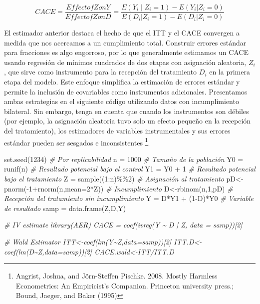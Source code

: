 \documentclass[
]{article}
\newenvironment{Shaded}{\begin{snugshade}}{\end{snugshade}}
\newcommand{\AttributeTok}[1]{\textcolor[rgb]{0.77,0.63,0.00}{#1}}
\newcommand{\CommentTok}[1]{\textcolor[rgb]{0.56,0.35,0.01}{\textit{#1}}}
\newcommand{\DecValTok}[1]{\textcolor[rgb]{0.00,0.00,0.81}{#1}}
\newcommand{\FunctionTok}[1]{\textcolor[rgb]{0.00,0.00,0.00}{#1}}
\newcommand{\NormalTok}[1]{#1}
\newcommand{\OtherTok}[1]{\textcolor[rgb]{0.56,0.35,0.01}{#1}}
\newcommand{\SpecialCharTok}[1]{\textcolor[rgb]{0.00,0.00,0.00}{#1}}
\begin{document}
\[CACE= \frac{Effect of Z on Y}{Effect of Z on D}=\frac{E(Y_i∣Z_i=1)-E(Y_i|Z_i=0)}{E(D_i|Z_i=1)-E(D_i|Z_i=0)}\]

El estimador anterior destaca el hecho de que el ITT y el CACE convergen
a medida que nos acercamos a un cumplimiento total. Construir errores
estándar para fracciones es algo engorroso, por lo que generalmente
estimamos un CACE usando regresión de mínimos cuadrados de dos etapas
con asignación aleatoria, \(Z_i\), que sirve como instrumento para la
recepción del tratamiento \(D_i\) en la primera etapa del modelo. Este
enfoque simplifica la estimación de errores estándar y permite la
inclusión de covariables como instrumentos adicionales. Presentamos
ambas estrategias en el siguiente código utilizando datos con
incumplimiento bilateral. Sin embargo, tenga en cuenta que cuando los
instrumentos son débiles (por ejemplo, la asignación aleatoria tuvo solo
un efecto pequeño en la recepción del tratamiento), los estimadores de
variables instrumentales y sus errores estándar pueden ser sesgados e
inconsistentes \footnote{Angrist, Joshua, and Jörn-Steffen Pischke.
  2008. Mostly Harmless Econometrics: An Empiricist's Companion.
  Princeton university press.; Bound, Jaeger, and Baker (1995)}.

\begin{Shaded}
\begin{Highlighting}[]
\FunctionTok{set.seed}\NormalTok{(}\DecValTok{1234}\NormalTok{) }\CommentTok{\# Por replicabilidad}
\NormalTok{n }\OtherTok{=} \DecValTok{1000} \CommentTok{\# Tamaño de la población}
\NormalTok{Y0 }\OtherTok{=} \FunctionTok{runif}\NormalTok{(n) }\CommentTok{\# Resultado potencial bajo el control}
\NormalTok{Y1 }\OtherTok{=}\NormalTok{ Y0 }\SpecialCharTok{+} \DecValTok{1} \CommentTok{\# Resultado potencial bajo el tratamiento }
\NormalTok{Z }\OtherTok{=} \FunctionTok{sample}\NormalTok{((}\DecValTok{1}\SpecialCharTok{:}\NormalTok{n)}\SpecialCharTok{\%\%}\DecValTok{2}\NormalTok{) }\CommentTok{\# Asignación al tratamiento}
\NormalTok{pD}\OtherTok{\textless{}{-}}\FunctionTok{pnorm}\NormalTok{(}\SpecialCharTok{{-}}\DecValTok{1}\SpecialCharTok{+}\FunctionTok{rnorm}\NormalTok{(n,}\AttributeTok{mean=}\DecValTok{2}\SpecialCharTok{*}\NormalTok{Z)) }\CommentTok{\# Incumplimiento}
\NormalTok{D}\OtherTok{\textless{}{-}}\FunctionTok{rbinom}\NormalTok{(n,}\DecValTok{1}\NormalTok{,pD) }\CommentTok{\# Recepción del tratamiento sin incumplimiento}
\NormalTok{Y }\OtherTok{=}\NormalTok{ D}\SpecialCharTok{*}\NormalTok{Y1 }\SpecialCharTok{+}\NormalTok{ (}\DecValTok{1}\SpecialCharTok{{-}}\NormalTok{D)}\SpecialCharTok{*}\NormalTok{Y0 }\CommentTok{\# Variable de resultado}
\NormalTok{samp }\OtherTok{=} \FunctionTok{data.frame}\NormalTok{(Z,D,Y) }

\CommentTok{\# IV estimate library(AER) CACE = coef(ivreg(Y \textasciitilde{} D | Z, data = samp))[2] }

\CommentTok{\# Wald Estimator ITT\textless{}{-}coef(lm(Y\textasciitilde{}Z,data=samp))[2] ITT.D\textless{}{-}coef(lm(D\textasciitilde{}Z,data=samp))[2] CACE.wald\textless{}{-}ITT/ITT.D}
\end{Highlighting}
\end{Shaded}
\end{document}
